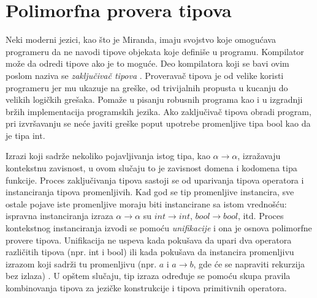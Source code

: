
\section{Polimorfna provera tipova}
\label{sec:provera tipova}


Neki moderni jezici, kao što je Miranda, imaju svojstvo koje omogućava programeru da ne navodi tipove objekata koje definiše u programu. Kompilator može da odredi tipove ako je to moguće. Deo kompilatora koji se bavi ovim poslom naziva se \textit{zaključivač tipova} \cite{the-implementation-of-functional-programming-languages}. Proveravač tipova je od velike koristi programeru jer mu ukazuje na greške, od trivijalnih propusta u kucanju do velikih logičkih grešaka. Pomaže u pisanju robusnih programa kao i u izgradnji bržih implementacija programskih jezika. Ako zaključivač tipova obradi program, pri izvršavanju se neće javiti greške poput upotrebe promenljive tipa bool kao da je tipa int.


Izrazi koji sadrže nekoliko pojavljivanja istog tipa, kao $\alpha \longrightarrow \alpha$, izražavaju kontekstnu zavisnost, u ovom slučaju to je zavisnost domena i kodomena tipa funkcije. Proces zaključivanja tipova sastoji se od uparivanja tipova operatora i instanciranja tipova promenljivih. Kad god se tip promenljive instancira, sve ostale pojave iste promenljive moraju biti instancirane sa istom vrednošću: ispravna instanciranja izraza $\alpha \longrightarrow \alpha$ su $int \longrightarrow int$,  $bool \longrightarrow bool$, itd. Proces kontekstnog instanciranja izvodi se pomoću \textit{unifikacije} i ona je osnova polimorfne provere tipova. Unifikacija ne uspeva kada pokušava da upari dva operatora različitih tipova (npr. int i bool) ili kada pokušava da instancira promenljivu izrazom koji sadrži tu promenljivu (npr. $a$ i $a\longrightarrow b$, gde će se napraviti rekurzija bez izlaza) \cite{basic-typechecking}. %
U opštem slučaju, tip izraza određuje se pomoću skupa pravila kombinovanja tipova za jezičke konstrukcije i tipova primitivnih operatora. 

